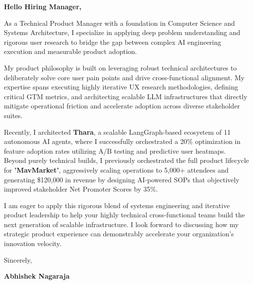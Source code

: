 \documentclass[11pt,letterpaper]{article} %
\begin{document}
\vspace{1.5em}

\textbf{Hello Hiring Manager,}

As a Technical Product Manager with a foundation in Computer Science and Systems Architecture, I specialize in applying deep problem understanding and rigorous user research to bridge the gap between complex AI engineering execution and measurable product adoption.

My product philosophy is built on leveraging robust technical architectures to deliberately solve core user pain points and drive cross-functional alignment. My expertise spans executing highly iterative UX research methodologies, defining critical GTM metrics, and architecting scalable LLM infrastructures that directly mitigate operational friction and accelerate adoption across diverse stakeholder suites.

Recently, I architected \textbf{Thara}, a scalable LangGraph-based ecosystem of 11 autonomous AI agents, where I successfully orchestrated a 20\% optimization in feature adoption rates utilizing A/B testing and predictive user heatmaps. Beyond purely technical builds, I previously orchestrated the full product lifecycle for \textbf{'MavMarket'}, aggressively scaling operations to 5,000+ attendees and generating \$120,000 in revenue by designing AI-powered SOPs that objectively improved stakeholder Net Promoter Scores by 35\%.

I am eager to apply this rigorous blend of systems engineering and iterative product leadership to help your highly technical cross-functional teams build the next generation of scalable infrastructure. I look forward to discussing how my strategic product experience can demonstrably accelerate your organization's innovation velocity.

\vspace{1.5em}
Sincerely,

\vspace{1.2em} %
\textbf{Abhishek Nagaraja}
\end{document}
